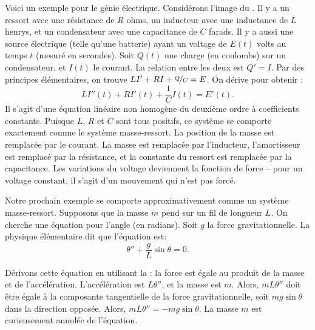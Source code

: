 \medskip

\begin{mywrapfigsimp}[5]{1.35in}{1.65in}
\noindent
{}
\end{mywrapfigsimp}
Voici un exemple pour le génie électrique. Considérons l'image du .
Il y a un ressort avec une résistance de $R$ ohms, un inducteur avec une inductance de $L$ henrys,
et un condensateur avec une capacitance de $C$ farads.  Il y a aussi une source électrique (telle qu'une batterie) ayant un voltage de  $E(t)$ volts au temps $t$ (mesuré en secondes).
Soit $Q(t)$ une charge (en coulombs) sur un condensateur, et $I(t)$ le courant.  La relation entre les deux est
$Q' = I$.  Par des principes élémentaires, on trouve 
$L I' + RI + \nicefrac{Q}{C} = E$.  On dérive pour obtenir :   
\begin{equation*}
	L I''(t) + R I'(t) + \frac{1}{C} I(t) = E'(t) .
\end{equation*}
Il s'agit d'une équation linéaire non homogène du deuxième ordre à coefficients constants. 
Puisque $L$, $R$ et $C$ sont tous positifs, ce système se comporte exactement comme le système masse-ressort. La position de la masse est remplacée par le courant. La masse est remplacée par l'inducteur, l'amortisseur est remplacé par la résistance, et la constante du ressort est remplacée par la capacitance. Les variations du voltage deviennent la fonction de force -- pour un voltage constant, il s'agit d'un mouvement qui n'est pas forcé. 

\medskip

\begin{mywrapfigsimp}[10]{1.8in}{2.16in}
\noindent
{}
\end{mywrapfigsimp}
Notre prochain exemple se comporte approximativement comme un système masse-ressort.  
Supposons que la masse $m$ pend sur un fil de longueur  $L$.  On cherche une équation pour l'angle (en radians). Soit $g$ la force gravitationnelle. La physique élémentaire dit que l'équation est: 
\begin{equation*}
	\theta'' + \frac{g}{L} \sin \theta = 0 .
\end{equation*}

Dérivons cette équation en utilisant la : 
la force est égale au produit de la masse et de l'accélération. L'accélération est
$L \theta''$, et la masse est $m$.  
Alors, $mL\theta''$ doit être égale à la composante tangentielle de la force gravitationnelle, soit 
$m g \sin \theta$ dans la direction opposée.
Alors, $mL\theta'' = -mg \sin \theta$.
La masse $m$ est curieusement  annulée de l'équation. 

